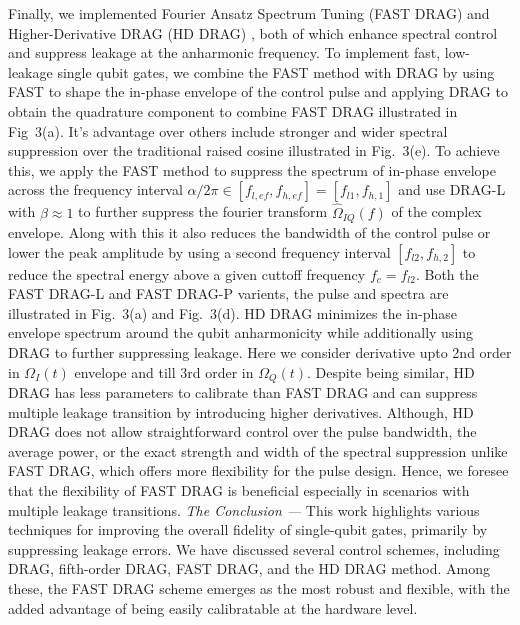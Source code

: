\documentclass[twocolumn]{article}
\begin{document}
\newline \newline \noindent
Finally, we implemented Fourier Ansatz Spectrum Tuning (FAST DRAG) and Higher-Derivative DRAG (HD DRAG) \cite{ref1}, both of which enhance spectral control and suppress leakage at the anharmonic frequency. To implement fast, low-leakage single qubit gates, we combine the FAST method with DRAG by using FAST to shape the in-phase envelope of the control pulse and applying DRAG to obtain the quadrature component to combine FAST DRAG illustrated in Fig~3(a). It's advantage over others include stronger and wider spectral suppression over the traditional raised cosine illustrated in Fig.~3(e). To achieve this, we apply the FAST method to suppress the spectrum of in-phase envelope across the frequency interval \(\alpha/2\pi \in [f_{l,ef}, f_{h, ef}] = [f_{l1}, f_{h,1}]\) and use DRAG-L with \(\beta \approx1\) to further suppress the fourier transform \(\hat\Omega_{IQ}(f)\) of the complex envelope. Along with this it also reduces the bandwidth of the control pulse or lower the peak amplitude by using a second frequency interval \([f_{l2},f_{h,2}]\) to reduce the spectral energy above a given cuttoff frequency \(f_c = f_{l2}\). Both the FAST DRAG-L and FAST DRAG-P varients, the pulse and spectra are illustrated in Fig.~3(a) and Fig.~3(d). HD DRAG minimizes the in-phase envelope spectrum around the qubit anharmonicity while additionally using DRAG to further suppressing leakage. Here we consider derivative upto 2nd order in \(\Omega_I(t)\) envelope and till 3rd order in \(\Omega_Q(t)\). 
\newline\newline \noindent
Despite being similar, HD DRAG has less parameters to calibrate than FAST DRAG and can suppress multiple leakage transition by introducing higher derivatives. Although, HD DRAG does not allow straightforward control over the pulse bandwidth, the average power, or the exact strength and width of the spectral suppression unlike FAST DRAG, which offers more flexibility for the pulse design. Hence, we foresee that the flexibility of FAST DRAG is beneficial especially in scenarios with multiple leakage transitions.
\newline\newline\noindent
\textit{The Conclusion ---}
This work highlights various techniques for improving the overall fidelity of single-qubit gates, primarily by suppressing leakage errors. We have discussed several control schemes, including DRAG, fifth-order DRAG, FAST DRAG, and the HD DRAG method. Among these, the FAST DRAG scheme emerges as the most robust and flexible, with the added advantage of being easily calibratable at the hardware level.
\end{document}

